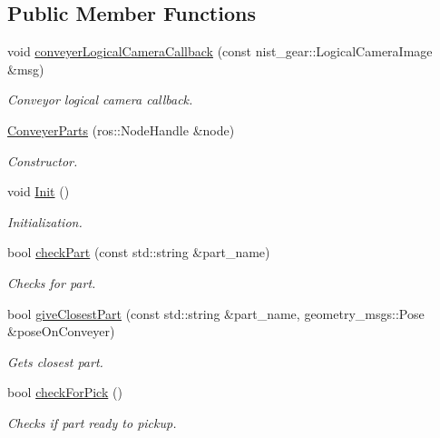 \subsection*{Public Member Functions}
\begin{DoxyCompactItemize}
\item 
void \hyperlink{classConveyerParts_a4e63b43cf4de0e31ed58a89b1fc2654c}{conveyer\+Logical\+Camera\+Callback} (const nist\+\_\+gear\+::\+Logical\+Camera\+Image \&msg)
\begin{DoxyCompactList}\small\item\em Conveyor logical camera callback. \end{DoxyCompactList}\item 
\hyperlink{classConveyerParts_a0b511cdd3b2d0c0587901b1443f43d49}{Conveyer\+Parts} (ros\+::\+Node\+Handle \&node)
\begin{DoxyCompactList}\small\item\em Constructor. \end{DoxyCompactList}\item 
void \hyperlink{classConveyerParts_ab701aac222b631fdf7a1d2a3465eaa67}{Init} ()
\begin{DoxyCompactList}\small\item\em Initialization. \end{DoxyCompactList}\item 
bool \hyperlink{classConveyerParts_aaa9a8364efc6d4247d8d5585b6b21859}{check\+Part} (const std\+::string \&part\+\_\+name)
\begin{DoxyCompactList}\small\item\em Checks for part. \end{DoxyCompactList}\item 
bool \hyperlink{classConveyerParts_a57188292039617070e9042ad3133a5f8}{give\+Closest\+Part} (const std\+::string \&part\+\_\+name, geometry\+\_\+msgs\+::\+Pose \&pose\+On\+Conveyer)
\begin{DoxyCompactList}\small\item\em Gets closest part. \end{DoxyCompactList}\item 
bool \hyperlink{classConveyerParts_a8a536ff479f28fcb38cf454a41f8387e}{check\+For\+Pick} ()
\begin{DoxyCompactList}\small\item\em Checks if part ready to pickup. \end{DoxyCompactList}\end{DoxyCompactItemize}
